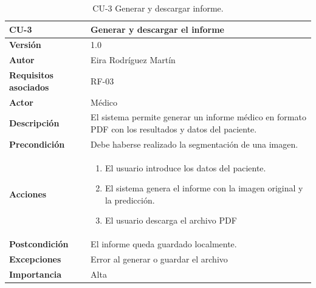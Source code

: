 \begin{table}[!h]
	\centering
	\begin{tabularx}{\linewidth}{ p{} p{} }
		\toprule
		\textbf{CU-3}    & \textbf{Generar y descargar el informe}\\
		\toprule
		\textbf{Versión}              & 1.0    \\
		\textbf{Autor}                & Eira Rodríguez Martín \\
		\textbf{Requisitos asociados} & RF-03 \\
        \textbf{Actor}                & Médico \\
		\textbf{Descripción}          & El sistema permite generar un informe médico en formato PDF con los resultados y datos del paciente.\\
		\textbf{Precondición}         & Debe haberse realizado la segmentación de una imagen. \\
		\textbf{Acciones}             &
		\begin{enumerate}
			\def\labelenumi{\arabic{enumi}.}
			\tightlist
			\item El usuario introduce los datos del paciente.
			\item El sistema genera el informe con la imagen original y la predicción.
            \item El usuario descarga el archivo PDF
		\end{enumerate}\\
		\textbf{Postcondición}        & El informe queda guardado localmente. \\
		\textbf{Excepciones}          & Error al generar o guardar el archivo \\
		\textbf{Importancia}          & Alta \\
		\bottomrule
	\end{tabularx}
	\caption{CU-3 Generar y descargar informe.}
\end{table}

